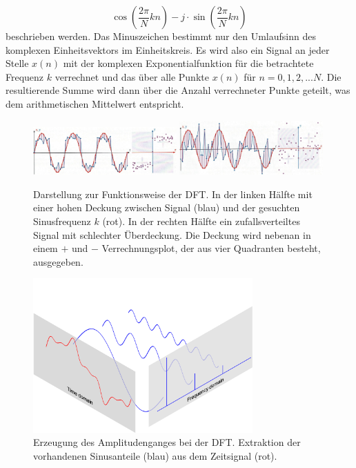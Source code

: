\begin{equation}
	\cos \left( \frac{2\pi}{N}kn \right) -j\cdot \sin \left( \frac{2\pi}{N}kn \right)
	\label{wavelets:equation2}
\end{equation} 
beschrieben werden.
Das Minuszeichen bestimmt nur den Umlaufsinn des komplexen
Einheitsvektors im Einheitskreis.
Es wird also ein Signal an jeder Stelle $x(n)$ mit der komplexen
Exponentialfunktion für die betrachtete Frequenz $k$ verrechnet und
das über alle Punkte $x(n)$ für $n=0,1,2,...N$.
Die resultierende Summe wird dann über die Anzahl verrechneter
Punkte geteilt, was dem arithmetischen Mittelwert entspricht.
\begin{figure}
	\centering
	\includegraphics[width=0.49\textwidth]{papers/wavelets/images/2_DFT1.png}
	\includegraphics[width=0.49\textwidth]{papers/wavelets/images/2_DFT2.png}
	\caption{\cite{wavelets:AndreasMuller.2019} Darstellung zur Funktionsweise der DFT.
In der linken Hälfte mit einer hohen Deckung zwischen Signal (blau)
und der gesuchten Sinusfrequenz $k$ (rot).
In der rechten Hälfte ein zufallsverteiltes Signal mit schlechter
Überdeckung.
Die Deckung wird nebenan in einem $+$ und $-$ Verrechnungsplot, der
aus vier Quadranten besteht, ausgegeben.}
	\label{wavelet:fig:2_DFT1&2}
\end{figure}%
\begin{figure}
	\centering
	\includegraphics[width=0.75\textwidth]{papers/wavelets/images/3_AmplitudengangExtraktionDFT.png}
	\caption{\cite{wavelets:QingkaiKong} Erzeugung des
	Amplitudenganges bei der DFT.
	Extraktion der vorhandenen Sinusanteile (blau) aus dem
	Zeitsignal (rot).}
	\label{wavelet:fig:AmplitudengangExtraktionDFT}
\end{figure}%


